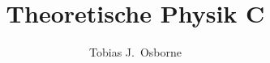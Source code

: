 \documentclass[12pt,oneside,reqno]{amsart}
\title[Theoretische Physik C]{Theoretische Physik C}
\author{Tobias J.\ Osborne}
\date{}
\begin{document}
\tpcscripttitle
\tableofcontents
\clearpage























\end{document}

